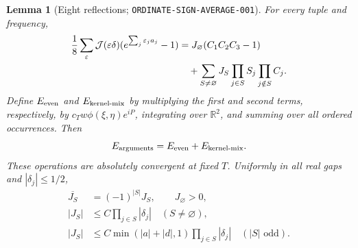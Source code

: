 \documentclass[11pt]{article}
\newtheorem{lemma}{Lemma}
\newcommand{\R}{\mathbb R}
\newcommand{\Ea}{E_{\mathrm{arguments}}}
\begin{document}
\begin{lemma}[Eight reflections; \texttt{ORDINATE-SIGN-AVERAGE-001}]
\label{lem:sign-average}
For every tuple and frequency,
\begin{align}
 \frac18\sum_\varepsilon\mathcal J(\varepsilon\delta)
       (e^{\sum_j\varepsilon_ja_j}-1)
 &=J_\varnothing(C_1C_2C_3-1)\notag\\
 &\quad+\sum_{S\ne\varnothing}J_S
           \prod_{j\in S}S_j\prod_{j\notin S}C_j.\label{eq:eight-sign}
\end{align}
Define $E_{\rm even}$ and $E_{\rm kernel\text{-}mix}$ by multiplying the
first and second terms, respectively, by $c_Tw\phi(\xi,\eta)e^{iP}$,
integrating over $\R^2$, and summing over all ordered occurrences. Then
\begin{equation}\label{eq:signed-split}
 \Ea=E_{\rm even}+E_{\rm kernel\text{-}mix}.
\end{equation}
These operations are absolutely convergent at fixed $T$. Uniformly in all
real gaps and $|\delta_j|\leq1/2$,
\begin{align}
 \overline{J_S}&=(-1)^{|S|}J_S,\qquad J_\varnothing>0,\label{eq:sign-parity}\\
 |J_S|&\leq C\prod_{j\in S}|\delta_j|\quad(S\ne\varnothing),\label{eq:sign-size}\\
 |J_S|&\leq C\min(|a|+|d|,1)\prod_{j\in S}|\delta_j|
                         \quad(|S|\text{ odd}).\label{eq:odd-gap}
\end{align}
\end{lemma}
\end{document}
